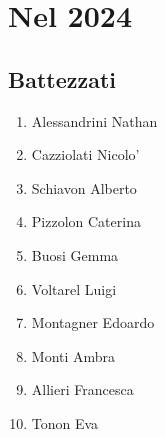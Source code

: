 \section{Nel 2024}

\subsection{Battezzati}
\begin{multicols}{2}
\begin{enumerate}
  \item Alessandrini Nathan
  \item Cazziolati Nicolo'
  \item Schiavon Alberto
  \item Pizzolon Caterina
  \item Buosi Gemma
  \item Voltarel Luigi
  \item Montagner Edoardo
  \item Monti Ambra
  \item Allieri Francesca
  \item Tonon Eva
\end{enumerate}
\end{multicols}

